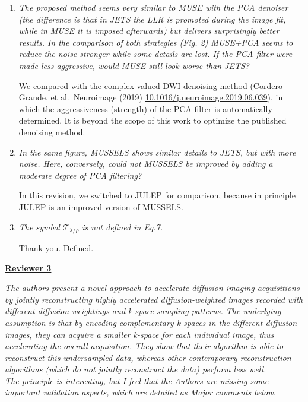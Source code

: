 \documentclass[a4paper,11pt,twoside]{report}
\begin{document}
\begin{enumerate}
    \item \textit{The proposed method seems very similar to MUSE with the PCA denoiser (the difference is that in JETS the LLR is promoted during the image fit, while in MUSE it is imposed afterwards) but delivers surprisingly better results. In the comparison of both strategies (Fig. 2) MUSE+PCA seems to reduce the noise stronger while some details are lost. If the PCA filter were made less aggressive, would MUSE still look worse than JETS?}

    \hspace{1em} We compared with the complex-valued DWI denoising method
    (Cordero-Grande, et al.~Neuroimage (2019)
    \href{https://doi.org/10.1016/j.neuroimage.2019.06.039}{10.1016/j.neuroimage.2019.06.039}), in which the aggressiveness (strength)
    of the PCA filter is automatically determined.
    It is beyond the scope of this work to optimize
    the published denoising method.

    \item \textit{In the same figure, MUSSELS shows similar details to JETS, but with more noise. Here, conversely, could not MUSSELS be improved by adding a moderate degree of PCA filtering?}

    \hspace{1em} In this revision, we switched to JULEP for comparison,
    because in principle JULEP is an improved version of MUSSELS.

    \item \textit{The symbol $\mathcal{T}_{\lambda / \rho}$ is not defined in Eq.7.}

    \hspace{1em} Thank you. Defined.

\end{enumerate}



\clearpage
\noindent \underline{\textbf{Reviewer 3}}

\textit{The authors present a novel approach to accelerate diffusion imaging acquisitions by jointly reconstructing highly accelerated diffusion-weighted images recorded with different diffusion weightings and k-space sampling patterns. The underlying assumption is that by encoding complementary k-spaces in the different diffusion images, they can acquire a smaller k-space for each individual image, thus accelerating the overall acquisition. They show that their algorithm is able to reconstruct this undersampled data, whereas other contemporary reconstruction algorithms (which do not jointly reconstruct the data) perform less well.\\
\indent The principle is interesting, but I feel that the Authors are missing some important validation aspects, which are detailed as Major comments below.}
\end{document}
